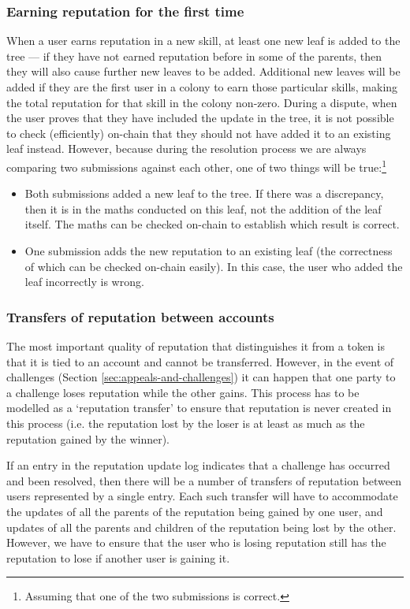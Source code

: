 \subsubsection{Earning reputation for the first time}\label{sec:earning-rep-for-first-time}
When a user earns reputation in a new skill, at least one new leaf is added to the tree --- if they have not earned reputation before in some of the parents, then they will also cause further new leaves to be added. Additional new leaves will be added if they are the first user in a colony to earn those particular skills, making the total reputation for that skill in the colony non-zero. During a dispute, when the user proves that they have included the update in the tree, it is not possible to check (efficiently) on-chain that they should not have added it to an existing leaf instead. However, because during the resolution process we are always comparing two submissions against each other, one of two things will be true:\footnote{Assuming that one of the two submissions is correct.}
\begin{itemize}
 \item Both submissions added a new leaf to the tree. If there was a discrepancy, then it is in the maths conducted on this leaf, not the addition of the leaf itself. The maths can be checked on-chain to establish which result is correct.
 \item One submission adds the new reputation to an existing leaf (the correctness of which can be checked on-chain easily). In this case, the user who added the leaf incorrectly is wrong.
\end{itemize}

\subsubsection{Transfers of reputation between accounts}\label{sec:reptransfer}

The most important quality of reputation that distinguishes it from a token is that it is tied to an account and cannot be transferred. However, in the event of challenges (Section \ref{sec:appeals-and-challenges}) it can happen that one party to a challenge loses reputation while the other gains. This process has to be modelled as a `reputation transfer' to ensure that reputation is never created in this process (i.e. the reputation lost by the loser is at least as much as the reputation gained by the winner).

If an entry in the reputation update log indicates that a challenge has occurred and been resolved, then there will be a number of transfers of reputation between users represented by a single entry. Each such transfer will have to accommodate the updates of all the parents of the reputation being gained by one user, and updates of all the parents and children of the reputation being lost by the other. However, we have to ensure that the user who is losing reputation still has the reputation to lose if another user is gaining it.

